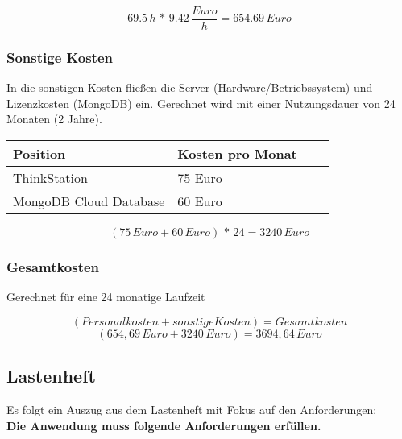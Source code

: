 	\[ 69.5\,h\,*\,9.42\,\frac{Euro}{h} = 654.69\,Euro \]


	\subsubsection{Sonstige Kosten}
	In die sonstigen Kosten fließen die Server (Hardware/Betriebssystem) und Lizenzkosten (MongoDB) ein. Gerechnet wird mit einer Nutzungsdauer von 24 Monaten (2 Jahre).\\

	\begin{table}[htp]

		\begin{center}
			\begin{tabular}{llll} \toprule
				Position & Kosten pro Monat \\ \bottomrule
				ThinkStation & 75 Euro \\
				MongoDB Cloud Database & 60 Euro \\ \bottomrule
			\end{tabular}
		\end{center}
	\end{table}
	
	\[ (75\,Euro + 60\,Euro)\,*\,24 = 3240\,Euro \]

	\subsubsection{Gesamtkosten}
	Gerechnet für eine 24 monatige Laufzeit
		
	\[ (Personalkosten + sonstige Kosten) = Gesamtkosten \]
	\[ (654,69\,Euro + 3240\,Euro) = 3694,64\,Euro \]



\subsection{Lastenheft}
Es folgt ein Auszug aus dem Lastenheft mit Fokus auf den Anforderungen:\\

\textbf{Die Anwendung muss folgende Anforderungen erfüllen.}

